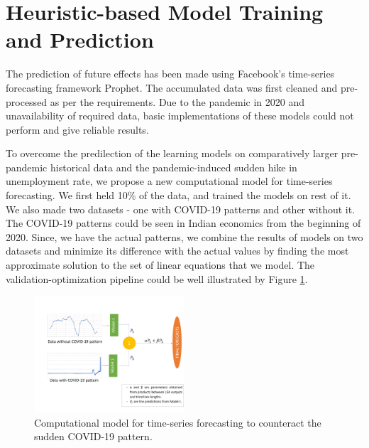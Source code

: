\documentclass[times,twocolumn,final,authoryear]{elsarticle}
\begin{document}
	\section{Heuristic-based Model Training and Prediction}\label{Sec_Heuristic}
	The prediction of future effects has been made using Facebook's time-series forecasting framework Prophet. The accumulated data was first cleaned and pre-processed as per the requirements. Due to the pandemic in 2020 and unavailability of required data, basic implementations of these models could not perform and give reliable results. 
	
	To overcome the predilection of the learning models on comparatively larger pre-pandemic historical data and the pandemic-induced sudden hike in unemployment rate, we propose a new computational model for time-series forecasting. We first held 10\% of the data, and trained the models on rest of it. We also made two datasets - one with COVID-19 patterns and other without it. The COVID-19 patterns could be seen in Indian economics from the beginning of 2020. Since, we have the actual patterns, we combine the results of models on two datasets and minimize its difference with the actual values by finding the most approximate solution to the set of linear equations that we model. The validation-optimization pipeline could be well illustrated by Figure \ref{Val-opt_Tech}.
	
	\begin{figure}[!t]
		\centering
		\includegraphics[width=0.5\textwidth]{Figures/Our_Arch.pdf}
		\caption{Computational model for time-series forecasting to counteract the sudden COVID-19 pattern.}
		\label{Val-opt_Tech}
	\end{figure}
	
\end{document}
